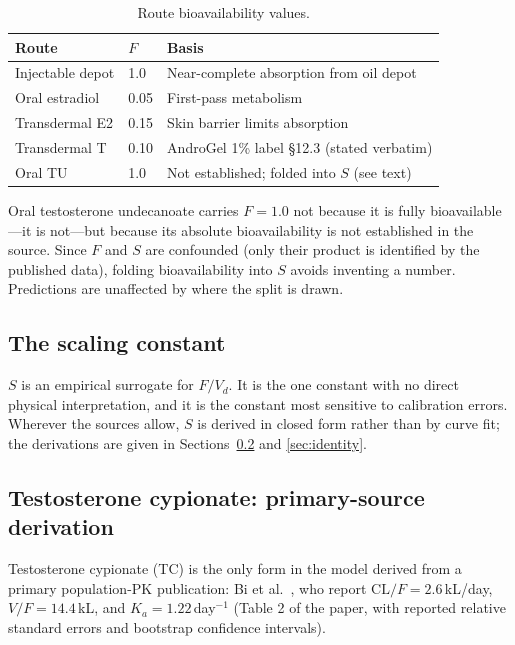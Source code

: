 \documentclass[11pt,a4paper]{article}
\begin{document}
\begin{table}[h]
\centering
\small
\begin{tabular}{@{}lll@{}}
\toprule
\textbf{Route} & \textbf{$F$} & \textbf{Basis} \\
\midrule
Injectable depot & 1.0 & Near-complete absorption from oil depot \\
Oral estradiol   & 0.05 & First-pass metabolism \\
Transdermal E2   & 0.15 & Skin barrier limits absorption \\
Transdermal T    & 0.10 & AndroGel 1\% label \S12.3 (stated verbatim) \\
Oral TU          & 1.0  & Not established; folded into $S$ (see text) \\
\bottomrule
\end{tabular}
\caption{Route bioavailability values.}
\label{tab:bioavailability}
\end{table}

Oral testosterone undecanoate carries $F = 1.0$ not because it is fully
bioavailable---it is not---but because its absolute bioavailability is
not established in the source. Since $F$ and $S$ are confounded (only
their product is identified by the published data), folding
bioavailability into $S$ avoids inventing a number. Predictions are
unaffected by where the split is drawn.

\subsection{The scaling constant}
\label{sec:scaling}

$S$ is an empirical surrogate for $F/V_d$. It is the one constant with
no direct physical interpretation, and it is the constant most sensitive
to calibration errors. Wherever the sources allow, $S$ is derived in
closed form rather than by curve fit; the derivations are given in
Sections~\ref{sec:tc} and \ref{sec:identity}.

\subsection{Testosterone cypionate: primary-source derivation}
\label{sec:tc}

Testosterone cypionate (TC) is the only form in the model derived from a
primary population-PK publication: Bi et al.~\cite{bi2018}, who report
$\mathrm{CL}/F = 2.6$\,kL/day, $V/F = 14.4$\,kL, and $K_a =
1.22$\,day$^{-1}$ (Table 2 of the paper, with reported relative standard
errors and bootstrap confidence intervals).
\end{document}

